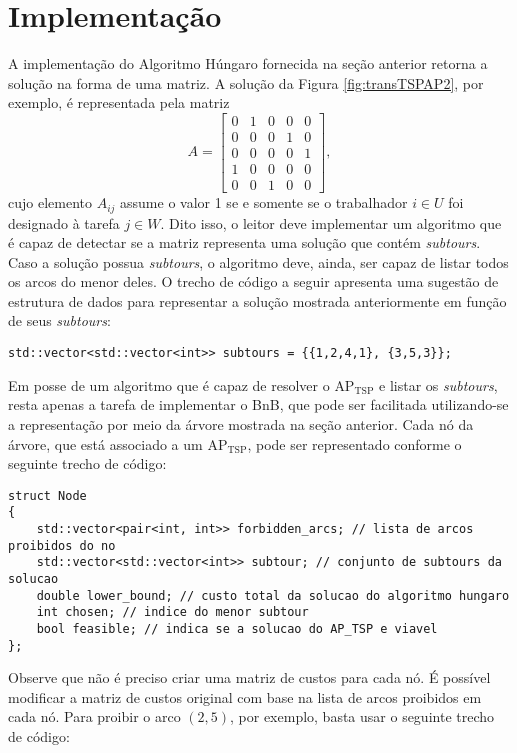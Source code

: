 {\section{Implementação}

A implementação do Algoritmo Húngaro fornecida na seção anterior retorna a solução na forma de uma matriz. A solução da Figura \ref{fig:transTSPAP2}, por exemplo, é representada pela matriz
\[
A = \begin{bmatrix}
	0 & 1 & 0 & 0 & 0 \\
	0 & 0 & 0 & 1 & 0 \\
	0 & 0 & 0 & 0 & 1 \\
	1 & 0 & 0 & 0 & 0 \\
	0 & 0 & 1 & 0 & 0
\end{bmatrix},
\]
cujo elemento $A_{ij}$ assume o valor 1 se e somente se o trabalhador $i \in U$ foi designado à tarefa $j \in W$. Dito isso, o leitor deve implementar um algoritmo que é capaz de detectar se a matriz representa uma solução que contém \textit{subtours}. Caso a solução possua \textit{subtours}, o algoritmo deve, ainda, ser capaz de listar todos os arcos do menor deles. O trecho de código a seguir apresenta uma sugestão de estrutura de dados para representar a solução mostrada anteriormente em função de seus \textit{subtours}:

\begin{lstlisting}[style=cplusplusListStyle]
std::vector<std::vector<int>> subtours = {{1,2,4,1}, {3,5,3}};
\end{lstlisting}

Em posse de um algoritmo que é capaz de resolver o $\text{AP}_{\text{TSP}}$ e listar os \textit{subtours}, resta apenas a tarefa de implementar o BnB, que pode ser facilitada utilizando-se a representação por meio da árvore mostrada na seção anterior. Cada nó da árvore, que está associado a um $\text{AP}_{\text{TSP}}$, pode ser representado conforme o seguinte trecho de código:

\begin{lstlisting}[style=cplusplusListStyle]
struct Node
{
    std::vector<pair<int, int>> forbidden_arcs; // lista de arcos proibidos do no
    std::vector<std::vector<int>> subtour; // conjunto de subtours da solucao
    double lower_bound; // custo total da solucao do algoritmo hungaro
    int chosen; // indice do menor subtour
    bool feasible; // indica se a solucao do AP_TSP e viavel
};
\end{lstlisting}

Observe que não é preciso criar uma matriz de custos para cada nó. É possível modificar a matriz de custos original com base na lista de arcos proibidos em cada nó. Para proibir o arco $(2,5)$, por exemplo, basta usar o seguinte trecho de código:

}
